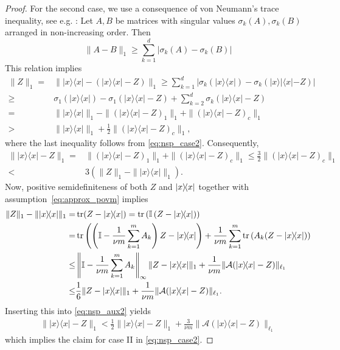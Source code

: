 \begin{proof}
For the second case, we use a consequence of von Neumann's trace inequality, see e.g. \cite[Theorem~7.4.9.1]{horn_topics_1991}: Let $ A,  B$ be matrices with singular values $\sigma_k ( A),\sigma_k ( B)$ arranged in non-increasing order.
Then
\[
  \|  A -  B \|_1 \geq \sum_{k=1}^d | \sigma_k ( A) - \sigma_k ( B)|
\]
This relation implies
\begin{align}
  \|  Z \|_1 =& \| |{x} \rangle \! \langle {x}| - (|{x} \rangle \! \langle {x}|- Z) \|_1
  \geq \sum_{k=1}^d \left| \sigma_k (| x \rangle \! \langle  x|) - \sigma_k (| x \rangle \! |\langle  x|-  Z ) \right| \\
  \geq & \sigma_1 (| x \rangle \langle  x|) - \sigma_1 \left( | x \rangle \! \langle  x| -  Z \right)+ \sum_{k=2}^d \sigma_k \left( | x \rangle \! \langle  x| -  Z\right) \\
  =&  \| | x \rangle \! \langle  x| \|_1  - \| (| x \rangle \! \langle  x| -  Z)_1 \|_1 + \|(| x \rangle \! \langle  x| - Z)_c \|_1 \\
  >& \| | x \rangle \! \langle  x| \|_1 + \frac{1}{2} \| (| x \rangle \! \langle  x|- Z)_c \|_1,
\end{align}
where the last inequality follows from \eqref{eq:nsp_case2}. Consequently,
\begin{align}
  \| | x \rangle \! \langle  x| -  Z \|_1
  =& \| (| x \rangle \! \langle  x| -  Z)_1 \|_1 + \| (| x \rangle \! \langle  x|- Z)_c \|_1
  \leq \frac{3}{2} \| (| x \rangle \! \langle  x|-  Z )_c \|_1 \nonumber \\
  < & 3 \left( \|  Z \|_1 - \| | x \rangle \! \langle  x| \|_1 \right). \label{eq:nsp_aux2}
\end{align}
Now, positive semidefiniteness of both $ Z$ and $\ket{ x}\bra{ x}$ together with assumption~\eqref{eq:approx_povm} implies
\begin{align}
  \|  Z \|_1 - \| |{x} \rangle \! \langle {x}| \|_1
  =& \tr ( Z-|{x} \rangle \! \langle {x}|) =  \tr \left( \mathbb{I} \left(  Z-| {x} \rangle \! \langle x|\right) \right) \\
  =&  \tr \left( \left( \mathbb{I} - \frac{1}{\nu m} \sum_{k=1}^m A_k \right)  Z-|{x} \rangle \! \langle {x}| \right) + \frac{1}{\nu m} \sum_{k=1}^m \tr \left( A_k ( Z-|{x} \rangle \! \langle {x}|) \right) \\
  \leq &  \left\|\mathbb{I}- \frac{1}{ \nu m} \sum_{k=1}^m A_k \right\|_\infty \|  Z-|{x} \rangle \! \langle {x}| \|_1 + \frac{1}{\nu m} \| \mathcal{A}(|{x} \rangle \! \langle {x}|- Z) \|_{\ell_1} \\
  \leq &  \frac{1}{6 } \|  Z-|{x} \rangle \! \langle {x}| \|_1 + \frac{1}{\nu m} \| \mathcal{A}(|{x} \rangle \! \langle {x}|- Z) \|_{\ell_1}.
\end{align}
Inserting this into \eqref{eq:nsp_aux2} yields
\begin{align}
\| | x \rangle \! \langle  x| -  Z \|_1 < \frac{1}{2} \| |{x} \rangle \! \langle {x}|- Z \|_1 +  \frac{3}{\nu m} \| \mathcal{A}(|{x} \rangle \! \langle {x}|- Z) \|_{\ell_1}
\end{align}
which implies the claim for case II in \eqref{eq:nsp_case2}.
\end{proof}


